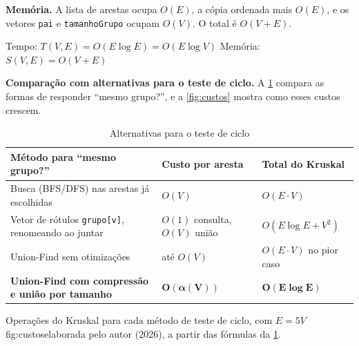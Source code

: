 \documentclass[a4paper]{article}
\newcommand{\fonte}[1]{\par\smallskip{\centering\footnotesize Fonte: #1\par}}
\begin{document}
\textbf{Memória.} A lista de arestas ocupa $O(E)$, a cópia ordenada mais $O(E)$, e
os vetores \texttt{pai} e \texttt{tamanhoGrupo} ocupam $O(V)$. O total é
$O(V + E)$.

\begin{complexidade}
Tempo: $T(V,E) = O(E \log E) = O(E \log V)$ \qquad Memória: $S(V,E) = O(V + E)$
\end{complexidade}

\textbf{Comparação com alternativas para o teste de ciclo.} A
\cref{tab:alternativas} compara as formas de responder ``mesmo grupo?'', e a
\cref{fig:custos} mostra como esses custos crescem.

\begin{table}[H]
\centering
\caption{Alternativas para o teste de ciclo}\label{tab:alternativas}
\small
\begin{tabularx}{\textwidth}{>{\raggedright\arraybackslash}X >{\raggedright\arraybackslash}p{3.3cm} >{\raggedright\arraybackslash}p{3.3cm}}
\toprule
Método para ``mesmo grupo?'' & Custo por aresta & Total do Kruskal \\
\midrule
Busca (BFS/DFS) nas arestas já escolhidas & $O(V)$ & $O(E \cdot V)$ \\
Vetor de rótulos \texttt{grupo[v]}, renomeando ao juntar & $O(1)$ consulta, $O(V)$ união & $O(E \log E + V^2)$ \\
Union-Find sem otimizações & até $O(V)$ & $O(E \cdot V)$ no pior caso \\
\textbf{Union-Find com compressão e união por tamanho} & $\mathbf{O(\alpha(V))}$ & $\mathbf{O(E \log E)}$ \\
\bottomrule
\end{tabularx}
\fonte{elaborada pelo autor (2026).}
\end{table}

\begin{figura}{Operações do Kruskal para cada método de teste de ciclo, com $E = 5V$}{fig:custos}{elaborada pelo autor (2026), a partir das fórmulas da \cref{tab:alternativas}.}
\end{figura}
\end{document}
